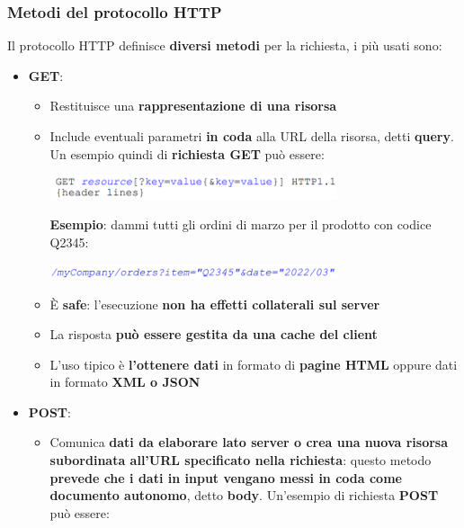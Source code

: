 \documentclass[12pt]{article}
\begin{document}
\subsubsection{Metodi del protocollo HTTP}
Il protocollo HTTP definisce \textbf{diversi metodi} per la richiesta, i più usati sono:
\begin{itemize}
    \item \textbf{GET}:
          \begin{itemize}
              \item Restituisce una \textbf{rappresentazione di una risorsa}
              \item Include eventuali parametri \textbf{in coda} alla URL della risorsa, detti \textbf{query}. Un esempio quindi di \textbf{richiesta GET} può essere:
                    \begin{center}
                        \includegraphics[width = 0.70\textwidth]{Images/120.PNG}
                    \end{center}
                    \textbf{Esempio}: dammi tutti gli ordini di marzo per il prodotto con codice Q2345:
                    \begin{center}
                        \includegraphics[width = 0.70\textwidth]{Images/122.PNG}
                    \end{center}
              \item È \textbf{safe}: l'esecuzione \textbf{non ha effetti collaterali sul server}
              \item La risposta \textbf{può essere gestita da una cache del client}
              \item L'uso tipico è \textbf{l'ottenere dati} in formato di \textbf{pagine HTML} oppure dati in formato \textbf{XML o JSON}
          \end{itemize}
    \item \textbf{POST}:
          \begin{itemize}
              \item Comunica \textbf{dati da elaborare lato server o crea una nuova risorsa subordinata all'URL specificato nella richiesta}: questo metodo \textbf{prevede che i dati in input vengano messi in coda come documento autonomo}, detto \textbf{body}. Un'esempio di richiesta \textbf{POST} può essere:

\end{itemize}
\end{itemize}
\end{document}
